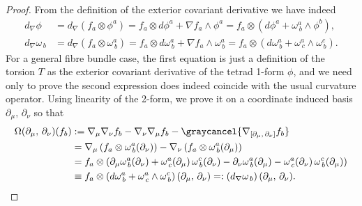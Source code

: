 \begin{proof}
From the definition of the exterior covariant derivative we have indeed
\begin{align}
    d_\nabla \phi &= d_\nabla (f_a \otimes \phi^a) = f_a \otimes d \phi^a  +  \nabla f_a \wedge \phi^a = f_a\otimes (d \phi^a + \omega^a_{\, b} \wedge \phi^b) ,
    \\
    d_\nabla \omega_{\, b} &= d_\nabla (f_a \otimes \omega^a_{\, b} ) = f_a\otimes d \omega^a_{\, b}  + \nabla f_a \wedge \omega^a_{\, b} = f_a\otimes (d \omega^a_{\, b} + \omega^a_{\, c} \wedge \omega^c_{\, b}).
\end{align}
For a general fibre bundle case, the first equation is just a definition of the torsion $T$ as the exterior covariant derivative of the tetrad 1-form $\phi$, and we need only to prove the second expression does indeed coincide with the usual curvature operator.
Using linearity of the 2-form, we prove it on a coordinate induced basis $\partial_\mu,\,\partial_\nu$ so that 
\begin{align}
    \Omega(\partial_\mu,\,\partial_\nu)(f_b)&:= \nabla_\mu \nabla_\nu f_b - \nabla_\nu \nabla_\mu f_b - \graycancel{\nabla_{[\partial_\mu,\,\partial_\nu]} f_b}
    \\
    &= \nabla_\mu \left( f_a \otimes \omega^a_{\, b}(\partial_\nu) \right) - \nabla_\nu \left( f_a \otimes \omega^a_{\, b}(\partial_\mu) \right)
    \\
    &= f_a \otimes \left( \partial_\mu \omega^a_{\, b}(\partial_\nu) + \omega^a_{\, c}(\partial_\mu) \, \omega^c_{\, b}(\partial_\nu) - \partial_\nu \omega^a_{\, b}(\partial_\mu) - \omega^a_{\, c}(\partial_\nu) \, \omega^c_{\, b}(\partial_\mu) \right)
    \\
    &\equiv f_a \otimes \left( d \omega^a_{\, b} + \omega^a_{\, c} \wedge \omega^c_{\, b} \right)(\partial_\mu,\,\partial_\nu) =: \left( d_\nabla \omega_{\, b} \right)(\partial_\mu,\,\partial_\nu).
\end{align}
%
\end{proof}


